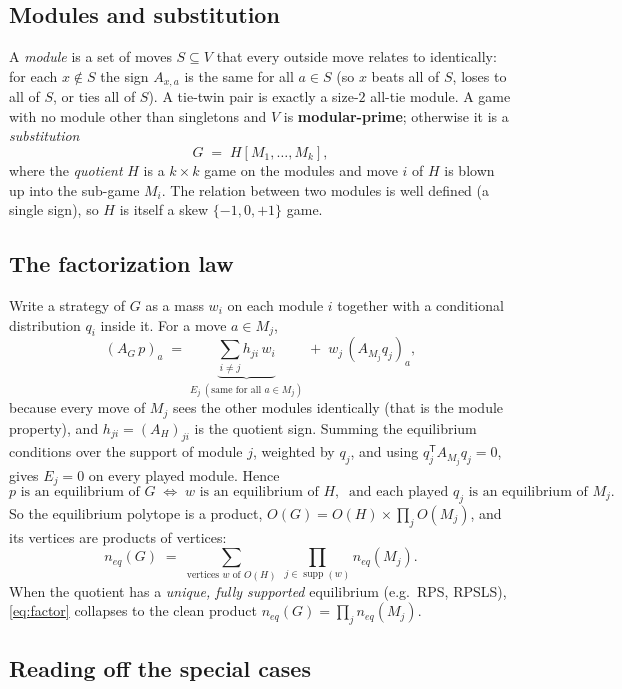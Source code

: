 \documentclass[11pt]{article}
\theoremstyle{plain}
\theoremstyle{definition}
\begin{document}
\subsection{Modules and substitution}

A \emph{module} is a set of moves $S\subseteq V$ that every outside move relates to
identically: for each $x\notin S$ the sign $A_{x,a}$ is the same for all $a\in S$ (so
$x$ beats all of $S$, loses to all of $S$, or ties all of $S$). A tie-twin pair is
exactly a size-$2$ all-tie module. A game with no module other than singletons and
$V$ is \textbf{modular-prime}; otherwise it is a \emph{substitution}
\[
  G \;=\; H[M_1,\dots,M_k],
\]
where the \emph{quotient} $H$ is a $k\times k$ game on the modules and move $i$ of $H$
is blown up into the sub-game $M_i$. The relation between two modules is well defined
(a single sign), so $H$ is itself a skew $\{-1,0,+1\}$ game.

\subsection{The factorization law}

Write a strategy of $G$ as a mass $w_i$ on each module $i$ together with a conditional
distribution $q_i$ inside it. For a move $a\in M_j$,
\[
  (A_G\,p)_a \;=\; \underbrace{\sum_{i\ne j} h_{ji}\,w_i}_{E_j\ (\text{same for all }a\in M_j)}
                 \;+\; w_j\,(A_{M_j} q_j)_a ,
\]
because every move of $M_j$ sees the other modules identically (that is the module
property), and $h_{ji}=(A_H)_{ji}$ is the quotient sign. Summing the equilibrium
conditions over the support of module $j$, weighted by $q_j$, and using
$q_j^{\mathsf T} A_{M_j} q_j = 0$, gives $E_j=0$ on every played module. Hence
\[
  p \text{ is an equilibrium of } G
  \;\Longleftrightarrow\;
  w \text{ is an equilibrium of } H,\ \text{ and each played } q_j \text{ is an equilibrium of } M_j .
\]
So the equilibrium polytope is a product, $O(G)=O(H)\times\prod_j O(M_j)$, and its
vertices are products of vertices:
\begin{equation}\label{eq:factor}
  n_{eq}(G) \;=\; \sum_{\text{vertices } w \text{ of } O(H)} \ \prod_{j\in\operatorname{supp}(w)} n_{eq}(M_j).
\end{equation}
When the quotient has a \emph{unique, fully supported} equilibrium (e.g.\ RPS, RPSLS),
\eqref{eq:factor} collapses to the clean product $n_{eq}(G)=\prod_j n_{eq}(M_j)$.

\subsection{Reading off the special cases}
\end{document}
